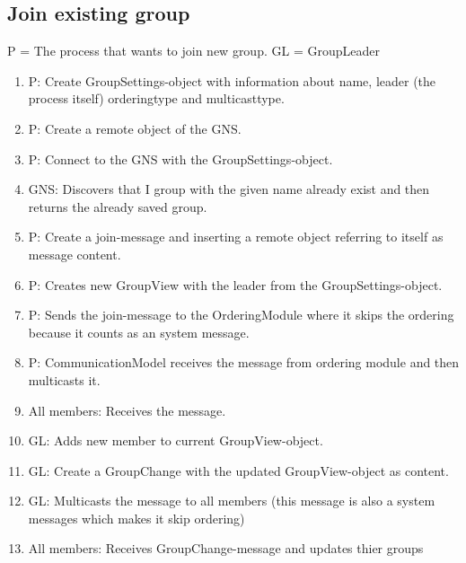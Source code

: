 \documentclass[titlepage, twocolumn, a4paper, 10pt]{article}
\begin{document}
\subsection{Join existing group}
P = The process that wants to join new group. GL = GroupLeader
\begin{enumerate}
\item P: Create GroupSettings-object with information about name,
  leader (the process itself) orderingtype and multicasttype.
\item P: Create a remote object of the GNS.
\item P: Connect to the GNS with the GroupSettings-object.
\item GNS: Discovers that I group with the given name already exist
  and then returns the already saved group.
\item P: Create a join-message and inserting a remote object referring
  to itself as message content.
\item P: Creates new GroupView with the leader from the
  GroupSettings-object.
\item P: Sends the join-message to the OrderingModule where it skips
  the ordering because it counts as an system message.
\item P: CommunicationModel receives the message from ordering module
  and then multicasts it.
\item All members: Receives the message.
\item GL: Adds new member to current GroupView-object.
\item GL: Create a GroupChange with the updated GroupView-object as content.
\item GL: Multicasts the message to all members (this message is also
  a system messages which makes it skip ordering)
\item All members: Receives GroupChange-message and updates thier groups
\end{enumerate}
\end{document}
